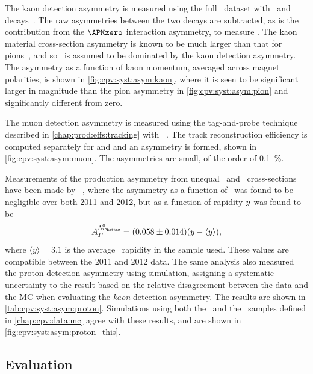The kaon detection asymmetry is measured using the full \runone\ dataset with 
\DpToKpipi\ and \decay{\PDplus}{\APKzero\Ppiplus} decays~\cite{Aaij:2014gsa}.
The raw asymmetries between the two decays are subtracted, as is the 
contribution from the $\APKzero$ interaction asymmetry, to measure \ADKpi.
The kaon material cross-section asymmetry is known to be much larger than that 
for pions~\cite{PDG2014}, and so \ADKpi\ is assumed to be dominated by the kaon 
detection asymmetry.
The asymmetry as a function of kaon momentum, averaged across magnet 
polarities, is shown in \cref{fig:cpv:syst:asym:kaon}, where it is seen to be 
significant larger in magnitude than the pion asymmetry in 
\cref{fig:cpv:syst:asym:pion} and significantly different from zero.

The muon detection asymmetry is measured using the tag-and-probe technique described in \cref{chap:prod:effs:tracking} with \JpsiTomumu~\cite{Stahl:2010261}.
The track reconstruction efficiency is computed separately for \Pmuon and 
\APmuon and an asymmetry is formed, shown in \cref{fig:cpv:syst:asym:muon}.
The asymmetries are small, of the order of \SI{0.1}{\percent}.

Measurements of the production asymmetry from unequal \PLambdab\ and 
\APLambdab\ cross-sections have been made by \lhcb~\cite{Aaij:2015fea}, where 
the asymmetry as a function of \pT\ was found to be negligible over both 2011 
and 2012, but as a function of rapidity $y$ was found to be
\begin{equation}
  \APLb = (0.058 \pm 0.014)(y - \langle{y}\rangle),
\end{equation}
where $\langle{y}\rangle = 3.1$ is the average \PLambdab\ rapidity in the 
sample used.
These values are compatible between the 2011 and 2012 data.
The same analysis also measured the proton detection asymmetry using 
simulation, assigning a systematic uncertainty to the result based on the 
relative disagreement between the data and the \ac{MC} when evaluating the 
\emph{kaon} detection asymmetry.
The results are shown in \cref{tab:cpv:syst:asym:proton}.
Simulations using both the \pKK\ and the \ppipi\ samples defined in 
\cref{chap:cpv:data:mc} agree with these results, and are shown in 
\cref{fig:cpv:syst:asym:proton_this}.

\subsection{Evaluation}
\label{chap:cpv:syst:asym:eval}


